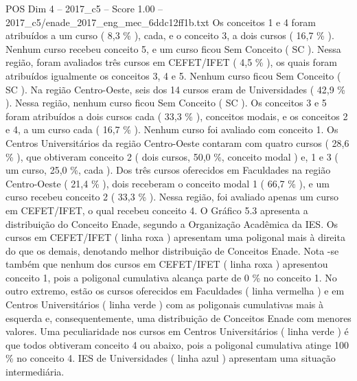 \begin{textsample}{POS Dim 4 – 2017\_c5 – Score 1.00 – 2017\_c5/enade\_2017\_eng\_mec\_6ddc12ff1b.txt}
Os conceitos 1 e 4 foram atribuídos a um curso ( 8,3 \% ), cada, e o conceito 3, a dois cursos ( 16,7 \% ).
Nenhum curso recebeu conceito 5, e um curso ficou Sem Conceito ( SC ).
Nessa região, foram avaliados três cursos em CEFET/IFET ( 4,5 \% ), os quais foram atribuídos igualmente os conceitos 3, 4 e 5.
Nenhum curso ficou Sem Conceito ( SC ).
Na região Centro-Oeste, seis dos 14 cursos eram de Universidades ( 42,9 \% ).
Nessa região, nenhum curso ficou Sem Conceito ( SC ).
Os conceitos 3 e 5 foram atribuídos a dois cursos cada ( 33,3 \% ), conceitos modais, e os conceitos 2 e 4, a um curso cada ( 16,7 \% ).
Nenhum curso foi avaliado com conceito 1.
Os Centros Universitários da região Centro-Oeste contaram com quatro cursos ( 28,6 \% ), que obtiveram conceito 2 ( dois cursos, 50,0 \%, conceito modal ) e, 1 e 3 ( um curso, 25,0 \%, cada ).
Dos três cursos oferecidos em Faculdades na região Centro-Oeste ( 21,4 \% ), dois receberam o conceito modal 1 ( 66,7 \% ), e um curso recebeu conceito 2 ( 33,3 \% ).
Nessa região, foi avaliado apenas um curso em CEFET/IFET, o qual recebeu conceito 4.
O Gráfico 5.3 apresenta a distribuição do Conceito Enade, segundo a Organização Acadêmica da IES.
Os cursos em CEFET/IFET ( linha roxa ) apresentam uma poligonal mais à direita do que os demais, denotando melhor distribuição de Conceitos Enade.
Nota -se também que nenhum dos cursos em CEFET/IFET ( linha roxa ) apresentou conceito 1, pois a poligonal cumulativa alcança parte de 0 \% no conceito 1.
No outro extremo, estão os cursos oferecidos em Faculdades ( linha vermelha ) e em Centros Universitários ( linha verde ) com as poligonais cumulativas mais à esquerda e, consequentemente, uma distribuição de Conceitos Enade com menores valores.
Uma peculiaridade nos cursos em Centros Universitários ( linha verde ) é que todos obtiveram conceito 4 ou abaixo, pois a poligonal cumulativa atinge 100 \% no conceito 4.
IES de Universidades ( linha azul ) apresentam uma situação intermediária.

\end{textsample}
